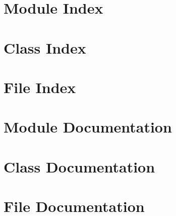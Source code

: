 \documentclass[twoside]{book}
\newcommand{\+}{\discretionary{\mbox{\scriptsize$\hookleftarrow$}}{}{}}
\newcommand{\clearemptydoublepage}{%
  \newpage{\pagestyle{empty}\cleardoublepage}%
}
\begin{document}
\chapter{Module Index}

\chapter{Class Index}

\chapter{File Index}

\chapter{Module Documentation}












\chapter{Class Documentation}

\chapter{File Documentation}
















\backmatter
\newpage
{}
\clearemptydoublepage
{}
\printindex
\end{document}
